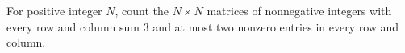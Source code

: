 For positive integer $N$, count the $N\times N$ matrices of nonnegative integers with every row and column sum $3$ and at most two nonzero entries in every row and column.
